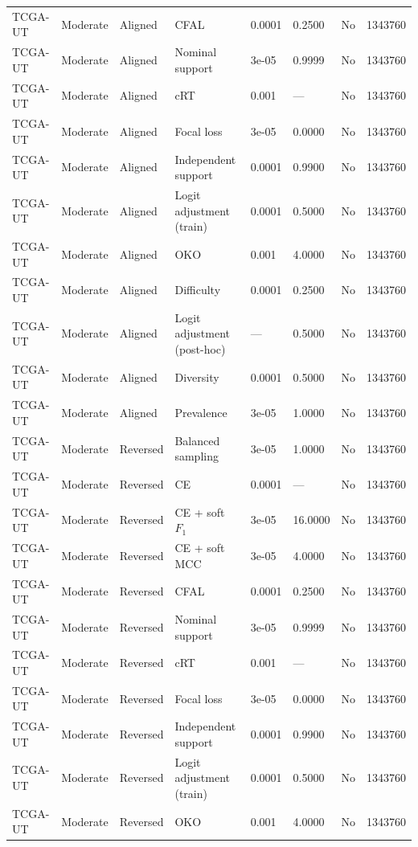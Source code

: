 \begin{longtable}{lllllllr}
TCGA-UT & Moderate & Aligned & CFAL & 0.0001 & 0.2500 & No & 1343760 \\
TCGA-UT & Moderate & Aligned & Nominal support & 3e-05 & 0.9999 & No & 1343760 \\
TCGA-UT & Moderate & Aligned & cRT & 0.001 & --- & No & 1343760 \\
TCGA-UT & Moderate & Aligned & Focal loss & 3e-05 & 0.0000 & No & 1343760 \\
TCGA-UT & Moderate & Aligned & Independent support & 0.0001 & 0.9900 & No & 1343760 \\
TCGA-UT & Moderate & Aligned & Logit adjustment (train) & 0.0001 & 0.5000 & No & 1343760 \\
TCGA-UT & Moderate & Aligned & OKO & 0.001 & 4.0000 & No & 1343760 \\
TCGA-UT & Moderate & Aligned & Difficulty & 0.0001 & 0.2500 & No & 1343760 \\
TCGA-UT & Moderate & Aligned & Logit adjustment (post-hoc) & --- & 0.5000 & No & 1343760 \\
TCGA-UT & Moderate & Aligned & Diversity & 0.0001 & 0.5000 & No & 1343760 \\
TCGA-UT & Moderate & Aligned & Prevalence & 3e-05 & 1.0000 & No & 1343760 \\
TCGA-UT & Moderate & Reversed & Balanced sampling & 3e-05 & 1.0000 & No & 1343760 \\
TCGA-UT & Moderate & Reversed & CE & 0.0001 & --- & No & 1343760 \\
TCGA-UT & Moderate & Reversed & CE + soft $F_1$ & 3e-05 & 16.0000 & No & 1343760 \\
TCGA-UT & Moderate & Reversed & CE + soft MCC & 3e-05 & 4.0000 & No & 1343760 \\
TCGA-UT & Moderate & Reversed & CFAL & 0.0001 & 0.2500 & No & 1343760 \\
TCGA-UT & Moderate & Reversed & Nominal support & 3e-05 & 0.9999 & No & 1343760 \\
TCGA-UT & Moderate & Reversed & cRT & 0.001 & --- & No & 1343760 \\
TCGA-UT & Moderate & Reversed & Focal loss & 3e-05 & 0.0000 & No & 1343760 \\
TCGA-UT & Moderate & Reversed & Independent support & 0.0001 & 0.9900 & No & 1343760 \\
TCGA-UT & Moderate & Reversed & Logit adjustment (train) & 0.0001 & 0.5000 & No & 1343760 \\
TCGA-UT & Moderate & Reversed & OKO & 0.001 & 4.0000 & No & 1343760 \\

\end{longtable}
